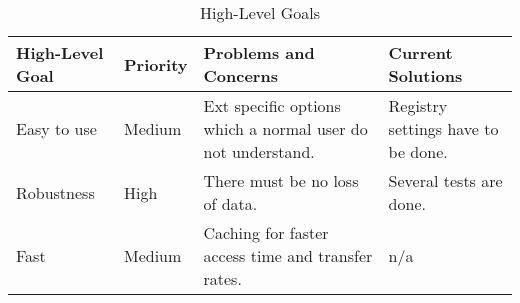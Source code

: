 \begin{longtable}{|p{2.1cm}|p{1.4cm}|X|X|}
	\caption[]{\label{tab:visionHighlevelGoals} High-Level Goals}\\
	\hline
	  \textbf{High-Level Goal} & 
	  \textbf{Priority} & 
	  \textbf{Problems and Concerns} & 
	  \textbf{Current Solutions} \\
	\hline
	\hline
	Easy to use & 
	Medium & 
	Ext specific options which a normal user do not understand.& 
	Registry settings have to be done. \\
	\hline
	Robustness &
	High &
	There must be no loss of data. &
	Several tests are done. \\
	\hline
	Fast &
	Medium &
	Caching for faster access time and transfer rates.&
	n/a \\
	\hline
\end{longtable}